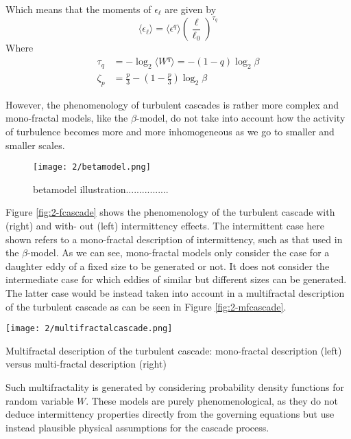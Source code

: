 Which means that the moments of $\epsilon_\ell$ are given by
\begin{equation}
    \langle\epsilon_\ell\rangle=\langle\epsilon^q\rangle\left(\frac{\ell}{\ell_0}\right)^{\tau_q}
\end{equation}
Where
\begin{align}
    \tau_q&=-\log_2\langle W^q\rangle = -(1-q)\log_2\beta\\
    \zeta_p&=\frac{p}{3}-\left(1-\frac{p}{3}\right)\log_2\beta
\end{align}

However, the phenomenology of turbulent cascades is rather more complex and mono-fractal models, like the $\beta$-model, do not take into account how the activity of turbulence becomes more and more inhomogeneous as we go to smaller and smaller scales. 
\begin{figure}[t]
\centering
\texttt{[image: 2/betamodel.png]}
\caption{betamodel illustration................}
\end{figure}
Figure \ref{fig:2-fcascade} shows the phenomenology of the turbulent cascade with (right) and with-
out (left) intermittency effects. The intermittent case here shown refers to a
mono-fractal description of intermittency, such as that used in the $\beta$-model.
As we can see, mono-fractal models only consider the case for a daughter eddy
of a fixed size to be generated or not. It does not consider the intermediate
case for which eddies of similar but different sizes can be generated. The latter
case would be instead taken into account in a multifractal description of the
turbulent cascade as can be seen in Figure \ref{fig:2-mfcascade}. 
\begin{marginfigure}
\texttt{[image: 2/multifractalcascade.png]}
\caption{Multifractal description of the turbulent cascade: mono-fractal
description (left) versus multi-fractal description (right)}
\label{fig:2-mfcascade}
\end{marginfigure}

Such multifractality is generated by considering probability density functions for random variable $W$. These models are purely phenomenological, as they do not deduce intermittency properties directly from the governing equations but use instead plausible physical assumptions for the cascade process.

